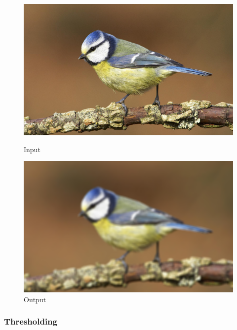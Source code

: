 \begin{figure}[htb]
    \centering
    \begin{minipage}[t]{0.45\linewidth}
        \centering
        \includegraphics[width=\linewidth]{pics/bildverarbeitungsalgos/input.png}
        \caption{Input}
        \label{maai:gaussianblur:input}
    \end{minipage}
    \hfill
    \begin{minipage}[t]{0.45\linewidth}
        \centering
        \includegraphics[width=\linewidth]{pics/bildverarbeitungsalgos/gaussianblur_output.png}
        \caption{Output}
        \label{maai:gaussianblur:output}
    \end{minipage}
\end{figure}


\subsubsection{Thresholding}

